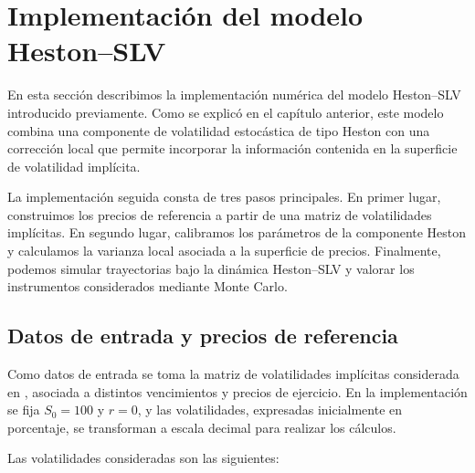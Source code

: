 \section{Implementación del modelo Heston--SLV}

En esta sección describimos la implementación numérica del modelo Heston--SLV introducido previamente. Como se explicó en el capítulo anterior, este modelo combina una componente de volatilidad estocástica de tipo Heston con una corrección local que permite incorporar la información contenida en la superficie de volatilidad implícita.

La implementación seguida consta de tres pasos principales. En primer lugar, construimos los precios de referencia a partir de una matriz de volatilidades implícitas. En segundo lugar, calibramos los parámetros de la componente Heston y calculamos la varianza local asociada a la superficie de precios. Finalmente, podemos simular trayectorias bajo la dinámica Heston--SLV y valorar los instrumentos considerados mediante Monte Carlo.

\subsection{Datos de entrada y precios de referencia}

Como datos de entrada se toma la matriz de volatilidades implícitas considerada en \cite[Cap. 8, Tabla 8.1]{oosterlee2021modelos}, asociada a distintos vencimientos y precios de ejercicio. En la implementación se fija $S_0=100$ y $r=0$, y las volatilidades, expresadas inicialmente en porcentaje, se transforman a escala decimal para realizar los cálculos.

Las volatilidades consideradas son las siguientes:

